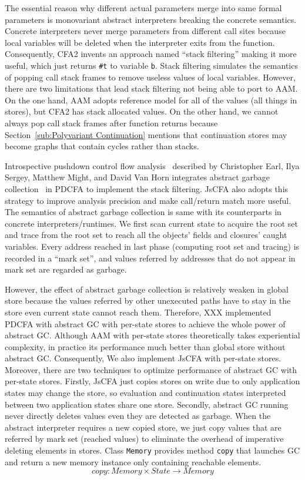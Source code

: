 \documentclass{article}
\begin{document}
The essential reason why different actual parameters merge into same formal parameters is monovariant abstract interpreters breaking the concrete semantics. Concrete interpreters never merge parameters from different call sites because local variables will be deleted when the interpreter exits from the function.
Consequently, CFA2 invents an approach named ``stack filtering'' making it more useful, which just returns \verb|#t| to variable \verb|b|. Stack filtering simulates the semantics of popping call stack frames to remove useless values of local variables. However, there are two limitations that lead stack filtering not being able to port to AAM\@. On the one hand, AAM adopts reference model for all of the values (all things in stores), but CFA2 has stack allocated values. On the other hand, we cannot always pop call stack frames after function returns because Section~\ref{sub:Polyvariant Continuation} mentions that continuation stores may become graphs that contain cycles rather than stacks.

Introspective pushdown control flow analysis~\cite{earl2012introspective} described by Christopher Earl, Ilya Sergey, Matthew Might, and David Van Horn integrates abstract garbage collection~\cite{might2006improving} in PDCFA to implement the stack filtering. JsCFA also adopts this strategy to improve analysis precision and make call/return match more useful. The semantics of abstract garbage collection is same with its counterparts in concrete interpreters/runtimes.
We first scan current state to acquire the root set and trace from the root set to reach all the objects' fields and closures' caught variables. Every address reached in last phase (computing root set and tracing) is recorded in a ``mark set'', and values referred by addresses that do not appear in mark set are regarded as garbage.

However, the effect of abstract garbage collection is relatively weaken in global store because the values referred by other unexecuted paths have to stay in the store even current state cannot reach them. Therefore, XXX implemented PDCFA with abstract GC with per-state stores to achieve the whole power of abstract GC\@. Although AAM with per-state stores theoretically takes experiential complexity, in practice its performance much better than global store without abstract GC\@.
Consequently, We also implement JsCFA with per-state stores. Moreover, there are two techniques to optimize performance of abstract GC with per-state stores. Firstly, JsCFA just copies stores on write due to only application states may change the store, so evaluation and continuation states interpreted between two application states share one store. Secondly, abstract GC running never directly deletes values even they are detected as garbage. When the abstract interpreter requires a new copied store, we just copy values that are referred by mark set (reached values) to eliminate the overhead of imperative deleting elements in stores.
Class \verb|Memory| provides method \verb|copy| that launches GC and return a new memory instance only containing reachable elements.
\[
copy: Memory \times State \to Memory
\]
\end{document}

